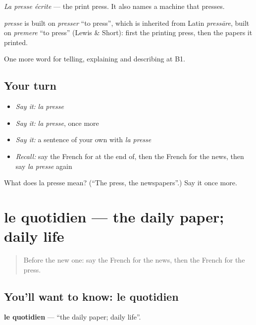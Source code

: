 \emph{La presse écrite} — the print press. It also names a machine that presses.

\begin{cousinweb}
\emph{presse} is built on \emph{presser} \textquotedblleft{}to press\textquotedblright{}, which is inherited from Latin \emph{pressāre}, built on \emph{premere} \textquotedblleft{}to press\textquotedblright{} (Lewis \& Short): first the printing press, then the papers it printed.
\end{cousinweb}

\begin{grammarlens}[title={What you've built}]
One more word for telling, explaining and describing at B1.
\end{grammarlens}

\subsection*{Your turn}
\begin{itemize}
\raggedright
  \item \emph{Say it:} \emph{la presse}
  \item \emph{Say it:} \emph{la presse}, once more
  \item \emph{Say it:} a sentence of your own with \emph{la presse}
  \item \emph{Recall:} say the French for at the end of, then the French for the news, then say \emph{la presse} again
\end{itemize}

\begin{tcolorbox}[breakable,colback=teal!4,colframe=teal!35!black,title={Before you move on}]
What does la presse mean? (\textquotedblleft{}The press, the newspapers\textquotedblright{}.) Say it once more.
\end{tcolorbox}
\section[le quotidien]{le quotidien — the daily paper; daily life}

\label{lesson:FR-C278-quotidien}



\begin{quote}
Before the new one: say the French for the news, then the French for the press.
\end{quote}

\subsection*{You'll want to know: le quotidien}
\textbf{le quotidien} — \textquotedblleft{}the daily paper; daily life\textquotedblright{}.

